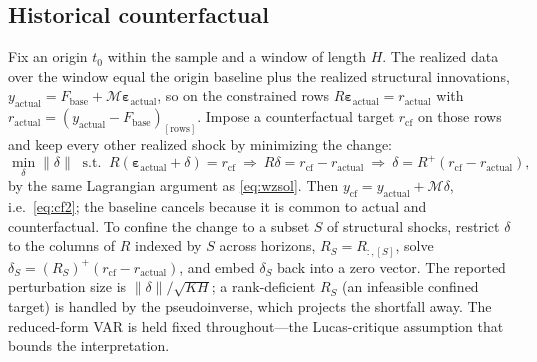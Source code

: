 \documentclass[11pt]{article}
\newcommand{\beps}{\bm{\varepsilon}}
\newcommand{\Mmap}{\mathcal{M}}
\newcommand{\pinv}[1]{#1^{+}}
\theoremstyle{remark}
\begin{document}
\subsection{Historical counterfactual}\label{app:cf}
Fix an origin $t_0$ within the sample and a window of length $H$. The realized
data over the window equal the origin baseline plus the realized structural
innovations, $y_{\text{actual}}=F_{\text{base}}+\Mmap\beps_{\text{actual}}$, so on
the constrained rows $R\beps_{\text{actual}}=r_{\text{actual}}$ with
$r_{\text{actual}}=(y_{\text{actual}}-F_{\text{base}})_{[\text{rows}]}$. Impose a
counterfactual target $r_{\text{cf}}$ on those rows and keep every other realized
shock by minimizing the change:
\[
\min_{\delta}\lVert\delta\rVert\ \text{ s.t. }\ R(\beps_{\text{actual}}+\delta)=r_{\text{cf}}
\ \Rightarrow\ R\delta=r_{\text{cf}}-r_{\text{actual}}
\ \Rightarrow\ \delta=\pinv{R}(r_{\text{cf}}-r_{\text{actual}}),
\]
by the same Lagrangian argument as \eqref{eq:wzsol}. Then
$y_{\text{cf}}=y_{\text{actual}}+\Mmap\delta$, i.e.\ \eqref{eq:cf2}; the baseline
cancels because it is common to actual and counterfactual. To confine the change
to a subset $S$ of structural shocks, restrict $\delta$ to the columns of $R$
indexed by $S$ across horizons, $R_S=R_{:,[S]}$, solve
$\delta_S=\pinv{(R_S)}(r_{\text{cf}}-r_{\text{actual}})$, and embed $\delta_S$ back
into a zero vector. The reported perturbation size is
$\lVert\delta\rVert/\sqrt{KH}$; a rank-deficient $R_S$ (an infeasible confined
target) is handled by the pseudoinverse, which projects the shortfall away. The
reduced-form VAR is held fixed throughout---the Lucas-critique assumption that
bounds the interpretation.
\end{document}
